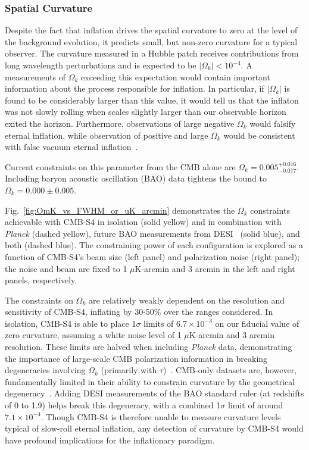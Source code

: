 \subsubsection{Spatial Curvature}
\label{sec:curvature}

Despite the fact that inflation drives the spatial curvature to zero at the level of the background evolution, it predicts small, but non-zero curvature for a typical observer. The curvature measured in a Hubble patch receives contributions from long wavelength perturbations and is expected to be $|\Omega_k|<10^{-4}$. A measurements of $\Omega_k$ exceeding this expectation would contain important information about the process responsible for inflation. In particular, if $|\Omega_k|$ is found to be considerably larger than this value, it would tell us that the inflaton was not slowly rolling when scales slightly larger than our observable horizon exited the horizon. Furthermore, observations of large negative $\Omega_k$ would falsify eternal inflation, while observation of positive and large $\Omega_k$ would be consistent with false vacuum eternal inflation~\cite{Guth:2012ww,Kleban:2012ph}.

Current constraints on this parameter from the CMB alone are $\Omega_k= 0.005^{+0.016}_{-0.017}$. Including baryon acoustic oscillation (BAO) data tightens the bound to $\Omega_k=0.000\pm0.005$.%

Fig.~\ref{fig:OmK_vs_FWHM_or_uK_arcmin} demonstrates the $\Omega_k$ constraints achievable with CMB-S4 in isolation (solid yellow) and in combination with {\it Planck\/} (dashed yellow), future BAO measurements from DESI~\cite{Font-Ribera:2013rwa} (solid blue), and both (dashed blue). The constraining power of each configuration is explored as a function of CMB-S4's beam size (left panel) and polarization noise (right panel); the noise and beam are fixed to 1 $\mu$K-arcmin and 3 arcmin in the left and right panels, respectively.

The constraints on $\Omega_k$ are relatively weakly dependent on the resolution and sensitivity of CMB-S4, inflating by 30-50\% over the ranges considered. In isolation, CMB-S4 is able to place 1$\sigma$ limits of $6.7\times10^{-3}$ on our fiducial value of zero curvature, assuming a white noise level of 1 $\mu$K-arcmin and 3 arcmin resolution. These limits are halved when including {\it Planck\/} data, demonstrating the importance of large-scale CMB polarization information in breaking degeneracies involving $\Omega_k$ (primarily with $\tau$)~\cite{Leonard:2016evk}. CMB-only datasets are, however, fundamentally limited in their ability to constrain curvature by the geometrical degeneracy~\cite{Zaldarriaga:1997ch,Bond:1997wr}. Adding DESI measurements of the BAO standard ruler (at redshifts of 0 to 1.9) helps break this degeneracy, with a combined 1$\sigma$ limit of around $7.1\times10^{-4}$. Though CMB-S4 is therefore unable to measure curvature levels typical of slow-roll eternal inflation, any detection of curvature by CMB-S4 would have profound implications for the inflationary paradigm.

